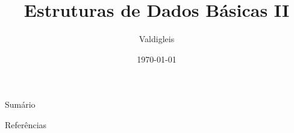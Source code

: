 \documentclass[presentation,t]{beamer}
\title[DIM0117]{Estruturas de Dados Básicas II}
\date{\today}
\author[Valdigleis]{Valdigleis\inst{1}}
\institute[UFRN]{
	\inst{1}%
        Universidade Federal do Rio Grande do Norte\\
        Centro de Ciência Exatas e da Terra\\
        Departamento de Informática e Matemática Aplicada\\
	\url{valdigleis@dimap.ufrn.br}\\
	\vspace{0.25cm}
}
\begin{document}
\frame{\titlepage}
\section[]{}
\begin{frame}{Sumário}
	\tableofcontents
\end{frame}





\begin{frame}{Referências}
  
\end{frame}
\end{document}
